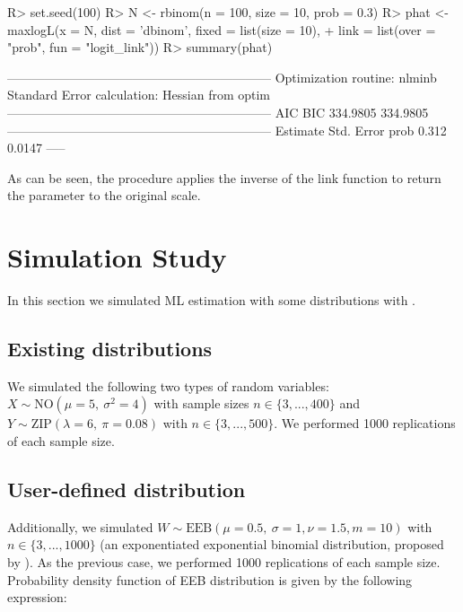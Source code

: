 \documentclass[nojss]{jss}
\begin{document}
\begin{Schunk}
\begin{Sinput}
R> set.seed(100)
R> N <- rbinom(n = 100, size = 10, prob = 0.3)
R> phat <- maxlogL(x = N, dist = 'dbinom', fixed = list(size = 10),
+                  link = list(over = "prob", fun = "logit_link"))
R> summary(phat)
\end{Sinput}
\begin{Soutput}
---------------------------------------------------------------
Optimization routine: nlminb 
Standard Error calculation: Hessian from optim 
---------------------------------------------------------------
       AIC      BIC
  334.9805 334.9805
---------------------------------------------------------------
     Estimate  Std. Error
prob     0.312     0.0147
-----
\end{Soutput}
\end{Schunk}

As can be seen, the procedure applies the inverse of the link function to return the parameter to the original scale.

\section{Simulation Study}

In this section we simulated ML estimation with some distributions with .

\subsection{Existing distributions}
We simulated the following two types of random variables: $X \sim \text{NO}(\mu=5,\: \sigma^2=4)$ with sample sizes $n \in \lbrace 3,...,400 \rbrace$ and $Y \sim \text{ZIP}(\lambda=6,\: \pi=0.08)$ with $n \in \lbrace 3,...,500 \rbrace$. We performed 1000 replications of each sample size.

\subsection{User-defined distribution}
Additionally, we simulated $W \sim \text{EEB}(\mu=0.5,\: \sigma=1, \nu=1.5, m=10)$ with $n \in \lbrace 3,...,1000 \rbrace$ (an exponentiated exponential binomial distribution, proposed by \cite{Bakouch2012}). As the previous case, we performed 1000 replications of each sample size. Probability density function of EEB distribution is given by the following expression:
\end{document}
